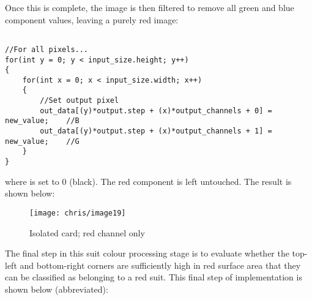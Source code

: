 		Once this is complete, the image is then filtered to remove all green and blue component values, leaving a purely red image:
		
		\begin{lstlisting}

//For all pixels...
for(int y = 0; y < input_size.height; y++)
{
	for(int x = 0; x < input_size.width; x++)
	{
		//Set output pixel              
		out_data[(y)*output.step + (x)*output_channels + 0] = new_value;    //B
		out_data[(y)*output.step + (x)*output_channels + 1] = new_value;    //G 
	}
}
		\end{lstlisting}

		where  is set to 0 (black). The red component is left untouched. The result is shown below:

		\begin{figure}[H]
			\centering
			\texttt{[image: chris/image19]}
			\caption{Isolated card; red channel only}
			\label{fig:redchan}
		\end{figure}

		The final step in this suit colour processing stage is to evaluate whether the top-left and bottom-right corners are sufficiently high in red surface area that they can be classified as belonging to a red suit. This final step of implementation is shown below (abbreviated):

